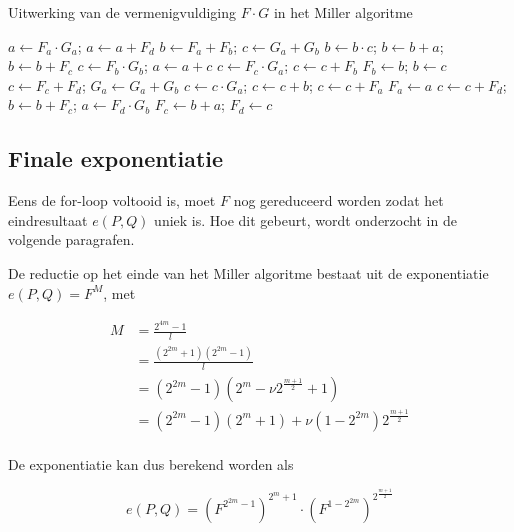 \begin{algorithm}[h]
	\caption{Uitwerking van de vermenigvuldiging $F \cdot G$ in het Miller algoritme}
	\label{algoritme-implementatie-miller-fg}
	$a \leftarrow F_a \cdot G_a$; $a \leftarrow a + F_d$\;
	$b \leftarrow F_a + F_b$; $c \leftarrow G_a + G_b$\;
	$b \leftarrow b \cdot c$; $b \leftarrow b + a$; $b \leftarrow b + F_c$\;
	$c \leftarrow F_b \cdot G_b$; $a \leftarrow a + c$\;
	$c \leftarrow F_c \cdot G_a$;	$c \leftarrow c + F_b$\;
	$F_b \leftarrow b$; $b \leftarrow c$\;
	$c \leftarrow F_c + F_d$; $G_a \leftarrow G_a + G_b$\;
	$c \leftarrow c \cdot G_a$; $c \leftarrow c + b$; $c \leftarrow c + F_a$\;
	$F_a \leftarrow a$\;
	$c \leftarrow c + F_d$; $b \leftarrow b + F_c$; $a \leftarrow F_d \cdot G_b$\;
	$F_c \leftarrow b + a$; $F_d \leftarrow c$\;
\end{algorithm}

\subsection{Finale exponentiatie}\label{subsectie-implementatie-miller-finale-exp}

Eens de for-loop voltooid is, moet $F$ nog gereduceerd worden zodat het eindresultaat $e(P, Q)$ uniek is. Hoe dit gebeurt, wordt onderzocht in de volgende paragrafen.

De reductie op het einde van het Miller algoritme bestaat uit de exponentiatie $e(P, Q) = F^M$, met

\[\begin{aligned}
M	&= \frac{2^{4m} - 1}{l}\\
	&= \frac{(2^{2m} + 1)(2^{2m} - 1)}{l}\\
	&= (2^{2m} - 1)(2^m - \nu 2^{\frac{m + 1}{2}} + 1)\\
	&= (2^{2m} - 1)(2^m + 1) + \nu(1 - 2^{2m})2^{\frac{m + 1}{2}}\\
\end{aligned}\]

De exponentiatie kan dus berekend worden als

\[e(P, Q) = \left(F^{2^{2m} - 1}\right)^{2^m + 1} \cdot \left(F^{1 - 2^{2m}}\right)^{2^{\frac{m + 1}{2}}}\]

